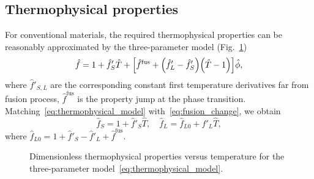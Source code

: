 \documentclass{article}
\newcommand{\fusion}[1]{{#1}^\mathrm{fus}}
\newcommand{\HT}{\hat{T}}
\newcommand{\Hf}{\hat{f}}
\newcommand{\Hphi}{\hat{\phi}}
\begin{document}
\subsection{Thermophysical properties}

For conventional materials, the required thermophysical properties can be reasonably approximated
by the three-parameter model (Fig.~\ref{fig:thermophysical})
\begin{equation}\label{eq:thermophysical_model}
	\Hf = 1 + \Hf'_S\HT + \qty[
	    \fusion{\Hf} + \qty(\Hf'_L-\Hf'_S) \qty(\HT-1)
	]\Hphi,
\end{equation}
where \(\Hf'_{S,L}\) are the corresponding constant first temperature derivatives far from fusion process,
\(\fusion{\Hf}\) is the property jump at the phase transition.
Matching~\eqref{eq:thermophysical_model} with~\eqref{eq:fusion_change}, we obtain
\begin{equation}\label{eq:thermophysical_model_explicit}
	\Hf_S = 1 + \Hf'_S\HT, \quad
	\Hf_L = \Hf_{L0} + \Hf'_L\HT,
\end{equation}
where \(\Hf_{L0} = 1 + \Hf'_S - \Hf'_L + \fusion{\Hf}\).

\begin{figure}
    \centering
    \caption{Dimensionless thermophysical properties versus temperature for the three-parameter model~\eqref{eq:thermophysical_model}.}
    \label{fig:thermophysical}
\end{figure}
\end{document}
